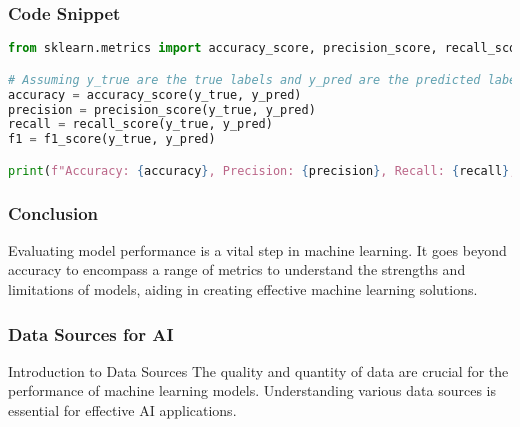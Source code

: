 \documentclass[aspectratio=169]{beamer}
\begin{document}
\begin{frame}[fragile]
  \frametitle{Code Snippet}
  \begin{lstlisting}[language=Python]
from sklearn.metrics import accuracy_score, precision_score, recall_score, f1_score

# Assuming y_true are the true labels and y_pred are the predicted labels
accuracy = accuracy_score(y_true, y_pred)
precision = precision_score(y_true, y_pred)
recall = recall_score(y_true, y_pred)
f1 = f1_score(y_true, y_pred)

print(f"Accuracy: {accuracy}, Precision: {precision}, Recall: {recall}, F1 Score: {f1}")
  \end{lstlisting}
\end{frame}

\begin{frame}
  \frametitle{Conclusion}
  Evaluating model performance is a vital step in machine learning. It goes beyond accuracy to encompass a range of metrics to understand the strengths and limitations of models, aiding in creating effective machine learning solutions.
\end{frame}

\begin{frame}[fragile]
    \frametitle{Data Sources for AI}
    \begin{block}{Introduction to Data Sources}
        The quality and quantity of data are crucial for the performance of machine learning models. Understanding various data sources is essential for effective AI applications.
    \end{block}
\end{frame}
\end{document}
